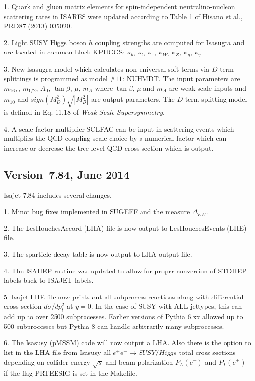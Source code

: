 1. Quark and gluon matrix elements for spin-independent neutralino-nucleon
scattering rates in ISARES were updated according to 
Table 1 of Hisano et al., PRD87 (2013) 035020. 

2. Light SUSY Higgs boson $h$ coupling strengths are computed for Isasugra
and are located in common block KPHGGS: $\kappa_b$, 
$\kappa_t$, $\kappa_\tau$, $\kappa_W$, $\kappa_Z$, $\kappa_g$, $\kappa_\gamma$.

3. New Isasugra model which calculates non-universal 
soft terms via $D$-term splittings is programmed as model $\#11$: NUHMDT.
The input parameters are $m_{16},$, $m_{1/2}$, $A_0$, $\tan\beta$, $\mu$, 
$m_A$ where $\tan\beta$, $\mu$ and $m_A$ are weak scale inputs
and $m_{10}$ and $sign(M_D^2)\sqrt{|M_D^2|}$ are output parameters. 
The $D$-term splitting model is defined in Eq. 11.18 of 
{\it Weak Scale Supersymmetry}.

4. A scale factor multiplier SCLFAC can be input in scattering events
which multiplies the QCD coupling scale choice by a numerical factor
which can increase or decrease the tree level QCD cross section which is output.

\subsection{Version~7.84, June 2014}

Isajet 7.84 includes several changes.

1. Minor bug fixes implemented in SUGEFF and the measure $\Delta_{EW}$.

2. The LesHouchesAccord (LHA) file is now output to LesHouchesEvents (LHE) file.

3. The sparticle decay table is now output to LHA output file.

4. The ISAHEP routine was updated to allow for proper conversion
of STDHEP labels back to ISAJET labels.

5. Isajet LHE file now prints out all subprocess reactions along with differential cross
section $d\sigma/dp_t^2$ at $y=0$. In the case of SUSY with ALL jettypes, this can add up
to over 2500 subprocesses. Earlier versions of Pythia 6.xx allowed up to 500 subprocesses but
Pythia 8 can handle arbitrarily many subprocesses. 

6. The Isasusy (pMSSM) code will now output a LHA. Also there is the option to list 
in the LHA file from Isasusy all $e^+e^-\rightarrow SUSY/Higgs$ total cross sections 
depending on collider energy $\sqrt{s}$ and beam polarization $P_L(e^-)$ and $P_L(e^+)$ if
the flag PRTEESIG is set in the Makefile.


